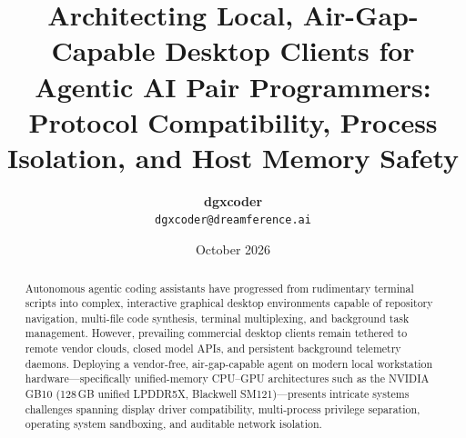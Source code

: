 \documentclass[11pt]{article}
\title{\textbf{Architecting Local, Air-Gap-Capable Desktop Clients for Agentic AI Pair Programmers: Protocol Compatibility, Process Isolation, and Host Memory Safety}}
\author{\textbf{dgxcoder}\\ \texttt{dgxcoder@dreamference.ai}}
\date{October 2026}
\begin{document}
\maketitle

\begin{abstract}
Autonomous agentic coding assistants have progressed from rudimentary terminal scripts into complex,
interactive graphical desktop environments capable of repository navigation, multi-file code synthesis,
terminal multiplexing, and background task management. However, prevailing commercial desktop clients
remain tethered to remote vendor clouds, closed model APIs, and persistent background telemetry daemons.
Deploying a vendor-free, air-gap-capable agent on modern local workstation hardware—specifically unified-memory
CPU--GPU architectures such as the NVIDIA GB10 (128\,GB unified LPDDR5X, Blackwell SM121)—presents
intricate systems challenges spanning display driver compatibility, multi-process privilege separation,
operating system sandboxing, and auditable network isolation.


\end{abstract}
\end{document}
